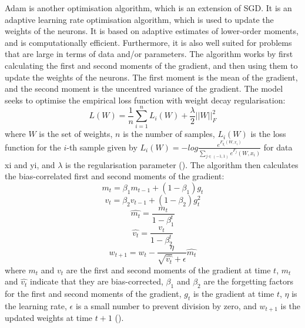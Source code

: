 \documentclass[12pt]{report}
\begin{document}
Adam is another optimisation algorithm, which is an extension of SGD. It is an adaptive learning rate optimisation algorithm, which is used to update the weights of the neurons. It is based on adaptive estimates of lower-order moments, and is computationally efficient. Furthermore, it is also well suited for problems that are large in terms of data and/or parameters. The algorithm works by first calculating the first and second moments of the gradient, and then using them to update the weights of the neurons. The first moment is the mean of the gradient, and the second moment is the uncentred variance of the gradient. The model seeks to optimise the empirical loss function with weight decay regularisation:
\begin{equation}
	L(W) = \frac{1}{n}\sum_{i=1}^{n}L_i(W)+\frac{\lambda}{2}||W||_F^2
\end{equation}
where $W$ is the set of weights, $n$ is the number of samples, $L_i(W)$ is the loss function for the $i$-th sample given by $L_i(W)=-log\frac{e^{F_{y_i}(W,x_i)}}{\sum_{j\in(-1,1)}e^{F_j}(W,x_i)}$ for data x\textunderscore i and y\textunderscore i, and $\lambda$ is the regularisation parameter (\cite{zou2021}). The algorithm then calculates the bias-correlated first and second moments of the gradient:
\begin{equation}
	m_t = \beta_1 m_{t-1} + (1-\beta_1)g_t
\end{equation}
\begin{equation}
	v_t = \beta_2 v_{t-1} + (1-\beta_2)g_t^2
\end{equation}
\begin{equation}
	\hat{m_t} = \frac{m_t}{1-\beta_1^t}
\end{equation}
\begin{equation}
	\hat{v_t} = \frac{v_t}{1-\beta_2^t}
\end{equation}
\begin{equation}
	w_{t+1} = w_t - \frac{\eta}{\sqrt{\hat{v_t}}+\epsilon}\hat{m_t}
\end{equation}
where $m_t$ and $v_t$ are the first and second moments of the gradient at time $t$, $\hat{m_t}$ and $\hat{v_t}$ indicate that they are bias-corrected, $\beta_1$ and $\beta_2$ are the forgetting factors for the first and second moments of the gradient, $g_t$ is the gradient at time $t$, $\eta$ is the learning rate, $\epsilon$ is a small number to prevent division by zero, and $w_{t+1}$ is the updated weights at time $t+1$ (\cite{kingma2017}).
\end{document}
